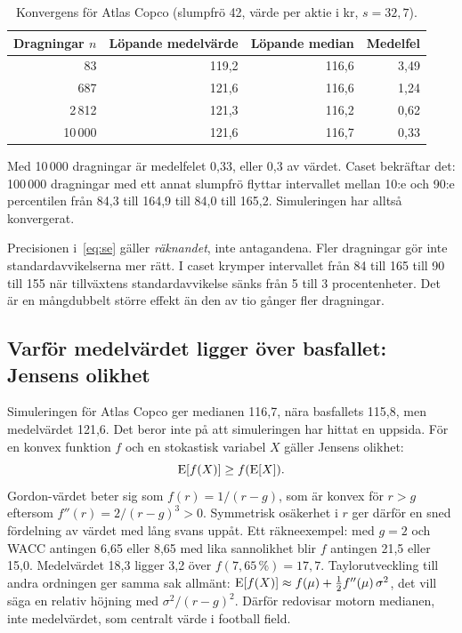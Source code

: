 \begin{table}[H]
\centering\small
\caption{Konvergens för Atlas Copco (slumpfrö 42, värde per aktie i kr, $s = 32,7$).}
\label{tab:konvergens}
\begin{tabular}{@{}rrrr@{}}
\toprule
Dragningar $n$ & Löpande medelvärde & Löpande median & Medelfel \\
\midrule
83 & 119,2 & 116,6 & 3,49 \\
687 & 121,6 & 116,6 & 1,24 \\
2\,812 & 121,3 & 116,2 & 0,62 \\
10\,000 & 121,6 & 116,7 & 0,33 \\
\bottomrule
\end{tabular}
\end{table}

Med 10\,000 dragningar är medelfelet 0,33\kr, eller 0,3\pct{} av värdet. Caset bekräftar det:
100\,000 dragningar med ett annat slumpfrö flyttar intervallet mellan 10:e och 90:e
percentilen från 84,3 till 164,9 till 84,0 till 165,2\kr. Simuleringen har alltså konvergerat.

\begin{komihag}
Precisionen i~\eqref{eq:se} gäller \emph{räknandet}, inte antagandena. Fler dragningar gör inte
standardavvikelserna mer rätt. I caset krymper intervallet från 84 till 165 till 90 till 155\kr{}
när tillväxtens standardavvikelse sänks från 5 till 3 procentenheter. Det är en
mångdubbelt större effekt än den av tio gånger fler dragningar.
\end{komihag}

\subsection{Varför medelvärdet ligger över basfallet: Jensens olikhet}

Simuleringen för Atlas Copco ger medianen 116,7\kr, nära basfallets 115,8, men medelvärdet
121,6. Det beror inte på att simuleringen har hittat en uppsida. För en konvex funktion $f$ och
en stokastisk variabel $X$ gäller Jensens olikhet:
\begin{equation}
  \operatorname{E}[f(X)] \ge f(\operatorname{E}[X]) .
  \label{eq:jensen}
\end{equation}
Gordon-värdet beter sig som $f(r) = 1/(r-g)$, som är konvex för $r > g$ eftersom
$f''(r) = 2/(r-g)^3 > 0$. Symmetrisk osäkerhet i $r$ ger därför en sned fördelning av värdet
med lång svans uppåt. Ett räkneexempel: med $g = 2$\pct{} och WACC antingen 6,65 eller
8,65\pct{} med lika sannolikhet blir $f$ antingen 21,5 eller 15,0. Medelvärdet 18,3 ligger
3,2\pct{} över $f(7,65\,\%) = 17,7$. Taylorutveckling till andra ordningen ger samma sak
allmänt: $\operatorname{E}[f(X)] \approx f(\mu) + \tfrac12 f''(\mu)\,\sigma^2$, det vill säga en relativ
höjning med $\sigma^2/(r-g)^2$. Därför redovisar motorn medianen, inte medelvärdet, som
centralt värde i football field.

